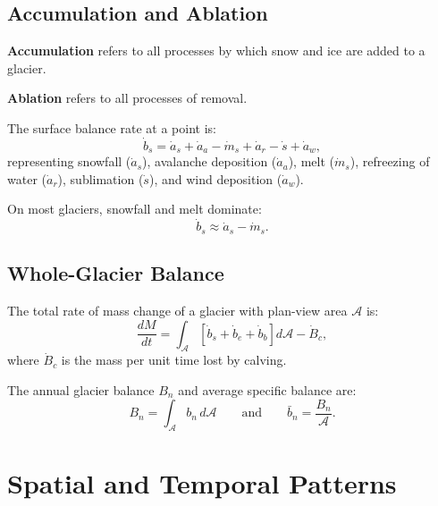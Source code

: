 \documentclass[11pt]{article}
\begin{document}
\subsection{Accumulation and Ablation}

\textbf{Accumulation} refers to all processes by which snow and ice are added to a glacier.  

\noindent\textbf{Ablation} refers to all processes of removal.

The surface balance rate at a point is:
\begin{equation}
  \dot{b}_s = \dot{a}_s + \dot{a}_a - \dot{m}_s + \dot{a}_r - \dot{s} + \dot{a}_w,
  \tag{C\&P Eq.~4.3}
\end{equation}
representing snowfall ($\dot{a}_s$), avalanche deposition ($\dot{a}_a$), melt ($\dot{m}_s$), refreezing of water ($\dot{a}_r$), sublimation ($\dot{s}$), and wind deposition ($\dot{a}_w$).

On most glaciers, snowfall and melt dominate:
\begin{equation}
  \dot{b}_s \approx \dot{a}_s - \dot{m}_s.
\end{equation}

\subsection{Whole-Glacier Balance}

The total rate of mass change of a glacier with plan-view area $\mathcal{A}$ is:
\begin{equation}
  \frac{dM}{dt} = \int_{\mathcal{A}} \left[\dot{b}_s + \dot{b}_e + \dot{b}_b\right] d\mathcal{A} - \dot{B}_c,
  \tag{C\&P Eq.~4.2}
\end{equation}
where $\dot{B}_c$ is the mass per unit time lost by calving.

The annual glacier balance $B_n$ and average specific balance are:
\begin{equation}
  B_n = \int_{\mathcal{A}} b_n \, d\mathcal{A} \qquad \text{and} \qquad \bar{b}_n = \frac{B_n}{\mathcal{A}}.
  \tag{C\&P Eq.~4.7}
\end{equation}

\section{Spatial and Temporal Patterns}
\end{document}
